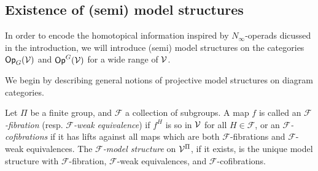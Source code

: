 \documentclass[a4paper,10pt]{article}%
\begin{document}
 
\subsection{Existence of (semi) model structures} 
\label{EXISTENCE_SECTION}

\renewcommand{\F}{\ensuremath{\mathcal F}} 

In order to encode the homotopical information inspired by $N_\infty$-operads dicussed in the introduction, we will introduce (semi) model structures on the categories $\mathsf{Op}_G(\mathcal V)$ and $\mathsf{Op}^G(\mathcal V)$ for a wide range of $\mathcal V$. 

We begin by describing general notions of projective model structures on diagram categories.

\begin{definition}
  Let $\Pi$ be a finite group, and $\F$ a collection of subgroups. A map $f$ is called an \textit{$\F$-fibration} (resp. \textit{$\F$-weak equivalence}) if $f^H$ is so in $\mathcal V$ for all $H\in \F$, or an \textit{$\F$-cofibrations} if it has lifts against all maps which are both $\F$-fibrations and $\F$-weak equivalences. The \textit{$\F$-model structure} on $\mathcal V^\Pi$, if it exists, is the unique model structure with $\F$-fibration, $\F$-weak equivalences, and $\F$-cofibrations.
\end{definition}
\end{document}
